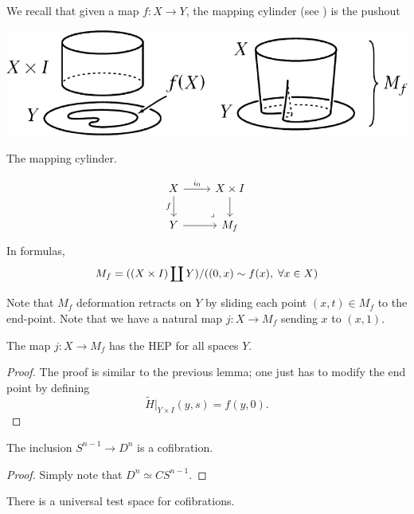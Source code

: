 \documentclass[ma3408.tex]{subfiles}
\begin{document}
\begin{Rem}
We recall that given a map $f \colon X \to Y$, the mapping cylinder (see ) is the pushout\begin{marginfigure}[5\baselineskip] \centering\includegraphics[scale = 0.2]{map_cylinder.png}\caption{The mapping cylinder.}\label{fig_mapping_cylinder}\end{marginfigure}
\[\begin{tikzcd}
	X & {X \times I} \\
	Y & {M_f}
	\arrow["f"', from=1-1, to=2-1]
	\arrow[from=2-1, to=2-2]
	\arrow["{i_0}", from=1-1, to=1-2]
	\arrow[from=1-2, to=2-2]
	\arrow["\ulcorner"{anchor=center, pos=0.125, rotate=180}, draw=none, from=2-2, to=1-1]
\end{tikzcd}\]
In formulas, 
\[
M_f = ((X \times I) \coprod Y)/((0,x) \sim f(x), \hspace{1mm} \forall x \in X)
\]

Note that $M_f$ deformation retracts on $Y$ by sliding each point $(x,t) \in M_f$ to the end-point. Note that we have a natural map $j \colon X \to M_f$ sending $x$ to $(x,1)$.
\end{Rem}
\begin{Lem}
The map $j \colon X \to M_f$ has the HEP for all spaces $Y$.
\end{Lem}
\begin{proof}
The proof is similar to the previous lemma; one just has to modify the end point by defining
\[
\tilde H|_{Y \times I}(y,s) = f(y,0). 
\]
\end{proof}
\begin{Cor}\label{cor:spheres_are_cofibrations}
The inclusion $S^{n-1} \to D^n$ is a cofibration. 
\end{Cor}
\begin{proof}
	Simply note that $D^n \simeq CS^{n-1}$. 
\end{proof}
There is a universal test space for cofibrations. 
\end{document}
